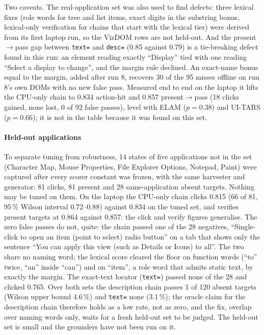 \documentclass[conference]{IEEEtran}
\newcommand{\code}[1]{\texttt{#1}}
\begin{document}
Two caveats. The real-application set was also used to find defects: three lexical fixes (role words for tree and list items, exact digits in the substring bonus, lexical-only verification for chains that start with the lexical tier) were derived from its first laptop run, so the VizDOM rows are not held-out. And the present$\rightarrow$pass gap between \code{text=} and \code{desc=} (0.85 against 0.79) is a tie-breaking defect found in this run: an element reading exactly ``Display'' tied with one reading ``Select a display to change'', and the margin rule declined. An exact-name bonus equal to the margin, added after run 8, recovers 30 of the 95 misses offline on run 8's own DOMs with no new false pass. Measured end to end on the laptop it lifts the CPU-only chain to 0.834 action-hit and 0.857 present$\rightarrow$pass (18 clicks gained, none lost, 0 of 92 false passes), level with ELAM ($p = 0.38$) and UI-TARS ($p = 0.66$); it is not in the table because it was found on this set.

\paragraph{Held-out applications} To separate tuning from robustness, 14 states of five applications not in the set (Character Map, Mouse Properties, File Explorer Options, Notepad, Paint) were captured after every scorer constant was frozen, with the same harvester and generator: 81 clicks, 81 present and 28 same-application absent targets. Nothing may be tuned on them. On the laptop the CPU-only chain clicks 0.815 (66 of 81, 95\,\% Wilson interval 0.72--0.88) against 0.834 on the tuned set, and verifies present targets at 0.864 against 0.857: the click and verify figures generalise. The zero false passes do not, quite: the chain passed one of the 28 negatives, ``Single-click to open an item (point to select) radio button'' on a tab that shows only the sentence ``You can apply this view (such as Details or Icons) to all''. The two share no naming word; the lexical score cleared the floor on function words (``to'' twice, ``an'' inside ``can'') and on ``item'', a role word that admits static text, by exactly the margin. The exact-text locator (\code{text=}) passed none of the 28 and clicked 0.765. Over both sets the description chain passes 1 of 120 absent targets (Wilson upper bound 4.6\,\%) and \code{text=} none (3.1\,\%); the oracle claim for the description chain therefore holds as a low rate, not as zero, and the fix, overlap over naming words only, waits for a fresh held-out set to be judged. The held-out set is small and the grounders have not been run on it.
\end{document}
